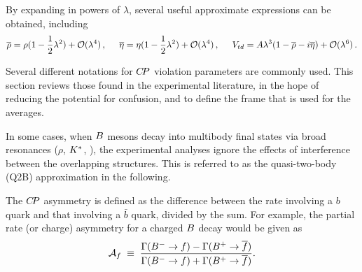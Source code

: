 By expanding in powers of $\lambda$, several useful approximate expressions
can be obtained, including
\begin{equation}
  \label{eq:rhoeta_approx}
  \overline{\rho} = \rho (1 - \frac{1}{2}\lambda^{2}) + {\cal O}(\lambda^4) \, ,
  \hspace{0.5cm}
  \overline{\eta} = \eta (1 - \frac{1}{2}\lambda^{2}) + {\cal O}(\lambda^4) \, ,
  \hspace{0.5cm}
  V_{td} = A \lambda^{3} (1-\overline{\rho} -i\overline{\eta}) + {\cal O}(\lambda^6) \, .
\end{equation}

\label{sec:cp_uta:notations}

Several different notations for $C\!P$ violation parameters
are commonly used.
This section reviews those found in the experimental literature,
in the hope of reducing the potential for confusion, 
and to define the frame that is used for the averages.

In some cases, when $B$ mesons decay into 
multibody final states via broad resonances ($\rho$, $K^*$, \etc),
the experimental analyses ignore the effects of interference 
between the overlapping structures.
This is referred to as the quasi-two-body (Q2B) approximation
in the following.

\label{sec:cp_uta:notations:pra}

The $C\!P$ asymmetry is defined as the difference between the rate 
involving a $b$ quark and that involving a $\bar b$ quark, divided 
by the sum. For example, the partial rate (or charge) asymmetry for 
a charged $B$ decay would be given as 
\begin{equation}
  \label{eq:cp_uta:pra}
  \Acp_{f} \;\equiv\; 
  \frac{\Gamma(\Bm \to f)-\Gamma(\Bp \to \bar{f})}{\Gamma(\Bm \to f)+\Gamma(\Bp \to \bar{f})}.
\end{equation}

\label{sec:cp_uta:notations:cp_eigenstate}

